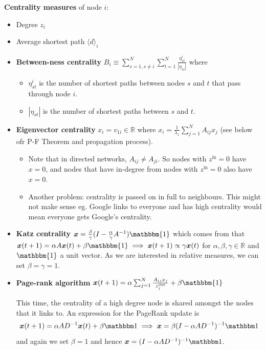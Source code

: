 \documentclass[12pt]{article}
\theoremstyle{definition}
\begin{document}
\textbf{Centrality measures} of node $i$: 
\begin{itemize}
    \item Degree $z_i$
    \item Average shortest path $\langle d\rangle_i$
    \item \textbf{Between-ness centrality} $B_i\equiv\sum_{s=1, s\neq i}^N\sum_{t=1}^N\frac{\eta_{st}^i}{|\eta_{st}|}$ where
    \begin{itemize}
        \item $\eta_{st}^i$ is the number of shortest paths between nodes $s$ and $t$ that pass through node $i$. 
        \item $|\eta_{st}|$ is the number of shortest paths between $s$ and $t$. 
    \end{itemize}
    \item \textbf{Eigenvector centrality} $x_i=v_{1i}\in\mathbb{R}$ where $x_i=\frac{1}{\lambda_1}\sum_{j=1}^NA_{ij}x_j$ (see below ofr P-F Theorem and propagation process). 
    \begin{itemize}
        \item Note that in directed networks, $A_{ij}\neq A_{ji}$. So nodes with $z^{\text{in}}=0$ have $x=0$, and nodes that have in-degree from nodes with $z^{\text{in}}=0$ also have $x=0$. 
        \item Another problem: centrality is passed on in full to neighbours. This might not make sense eg. Google links to everyone and has high centrality would mean everyone gets Google's centrality.
    \end{itemize}
    \item \textbf{Katz centrality} $\boldsymbol{x}=\frac{\beta}{\gamma}(I-\frac{\alpha}{\gamma}A^{-1})\mathbbm{1}$ which comes from that $\boldsymbol{x}(t+1)=\alpha A\boldsymbol{x}(t)+\beta\mathbbm{1} \implies \boldsymbol{x}(t+1) \propto \gamma\boldsymbol{x}(t)$ for $\alpha,\beta, \gamma\in\mathbb{R}$ and $\mathbbm{1}$ a unit vector. As we are interested in relative measures, we can set $\beta=\gamma=1$. 

    \item \textbf{Page-rank algorithm} $\boldsymbol{x}(t+1)=\alpha\sum_{j=1}^N\frac{A_{ij}x_j}{z_j^{\text{out}}}+\beta\mathbbm{1}$

    This time, the centrality of a high degree node is shared amongst the nodes that it links to. An expression for the PageRank update is
    \[ \boldsymbol{x}(t+1) = \alpha AD^{-1}\boldsymbol{x}(t)  + \beta \mathbbm 1 \implies \boldsymbol{x} = \beta(I - \alpha AD^{-1})^{-1} 
    \mathbbm 1\]
    and again we set $\beta = 1$ and hence $\boldsymbol{x} = (I - \alpha AD^{-1})^{-1} \mathbbm 1$. 
    
\end{itemize}
\end{document}
